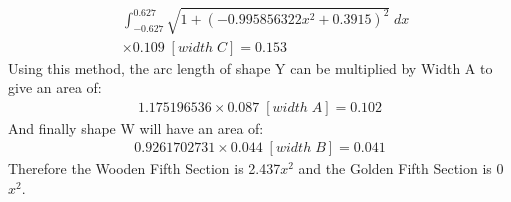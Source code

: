 \documentclass[a4paper,12pt]{article}
\begin{document}
\begin{equation}
\begin{aligned} 
&\int_{-0.627}^{0.627}{\sqrt{1+(-0.995856322x^2+0.3915)^2}}\;dx\\&\times0.109\; [width\; C]=0.153
\end{aligned}
\end{equation}
Using this method, the arc length of shape Y can be multiplied by Width A to give an area of:
\begin{equation}
\begin{aligned} 
1.175196536\times0.087\; [width\; A]=0.102
\end{aligned}
\end{equation}
And finally shape W will have an area of:
\begin{equation}
\begin{aligned} 
0.9261702731\times0.044\; [width\; B]=0.041
\end{aligned}
\end{equation}
Therefore the Wooden Fifth Section is 2.437$x^2$ and the Golden Fifth Section is 0$x^2$.
\end{document}

